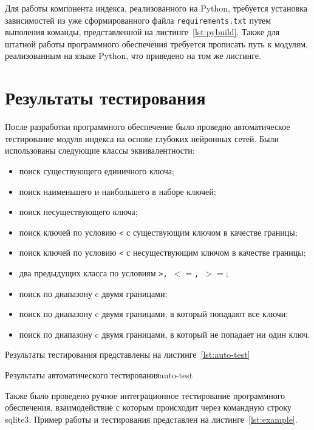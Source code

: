 
Для работы компонента индекса, реализованного на Python, требуется установка
зависимостей из уже сформированного файла \texttt{requirements.txt} путем
выполения команды, представленной на листинге~\ref{lst:pybuild}. Также для
штатной работы программного обеспечения требуется прописать путь к модулям,
реализованным на языке Python, что приведено на том же листинге.


\section{Результаты тестирования}

После разработки программного обеспечение было проведно автоматическое
тестирование модуля индекса на основе глубоких нейронных сетей. Были
использованы следующие классы эквивалентности:

\begin{itemize}
    \item поиск существующего единичного ключа;
    \item поиск наименьшего и наибольшего в наборе ключей;
    \item поиск несуществующего ключа;
    \item поиск ключей по условию \texttt{<} с существующим ключом в качестве
        границы;
    \item поиск ключей по условию \texttt{<} с несуществующим ключом в качестве
        границы;
    \item два предыдущих класса по условиям \texttt{>, $<=$, $>=$};
    \item поиск по диапазону c двумя границами;
    \item поиск по диапазону c двумя границами, в который попадают все ключи;
    \item поиск по диапазону c двумя границами, в который не попадает ни один
        ключ.
\end{itemize}

Результаты тестирования представлены на листинге~\ref{lst:auto-test}

{}{Результаты автоматического тестирования}{auto-test}{}

Также было проведено ручное интеграционное тестирование программного
обеспечения, взаимодействие с которым происходит через командную строку sqlite3.
Пример работы и тестирования представлен на листинге~\ref{lst:example}.

